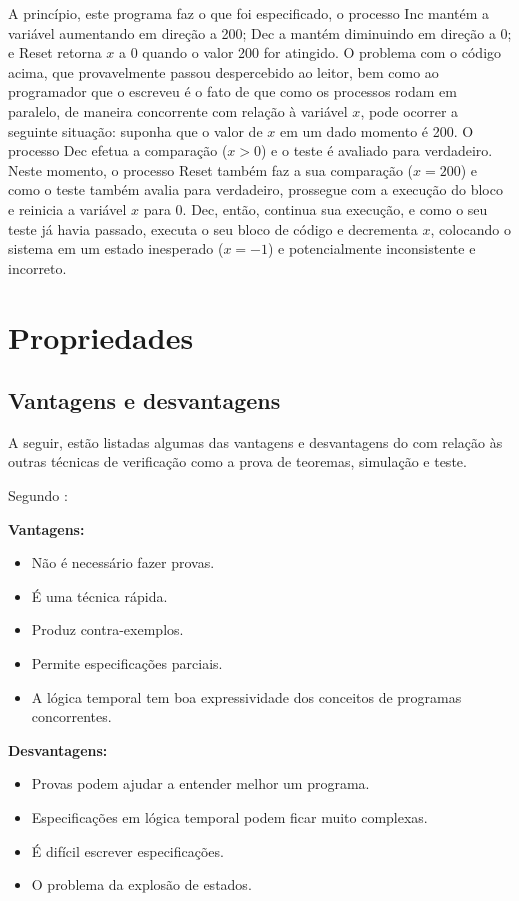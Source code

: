 \documentclass[12pt,openright,oneside,chapter=TITLE,section=TITLE,hidelinks,brazil]{utfpr-pg}
\begin{document}
A princípio, este programa faz o que foi especificado, o processo \textsf{Inc} mantém a variável aumentando em direção a 200; \textsf{Dec} a mantém diminuindo em direção a 0; e \textsf{Reset} retorna $\mathit{x}$ a 0 quando o valor 200 for atingido. O problema com o código acima, que provavelmente passou despercebido ao leitor, bem como ao programador que o escreveu é o fato de que como os processos rodam em paralelo, de maneira concorrente com relação à variável $\mathit{x}$, pode ocorrer a seguinte situação: suponha que o valor de $\mathit{x}$ em um dado momento é 200. O processo \textsf{Dec} efetua a comparação ($\mathit{x} > 0$) e o teste é avaliado para verdadeiro. Neste momento, o processo \textsf{Reset} também faz a sua comparação ($\mathit{x} = 200$) e como o teste também avalia para verdadeiro, prossegue com a execução do bloco e reinicia a variável $\mathit{x}$ para 0. \textsf{Dec}, então, continua sua execução, e como o seu teste já havia passado, executa o seu bloco de código e decrementa $\mathit{x}$, colocando o sistema em um estado inesperado ($\mathit{x} = -1$) e potencialmente inconsistente e incorreto.

\section{Propriedades}
\lipsum[55]

\subsection{Vantagens e desvantagens}
A seguir, estão listadas algumas das vantagens e desvantagens do com relação às outras técnicas de verificação como a prova de teoremas, simulação e teste.

Segundo :

\noindent
\begin{minipage}[t]{0.49\columnwidth}%
\noindent \textbf{Vantagens:}
\begin{itemize}
\item Não é necessário fazer provas.
\item É uma técnica rápida.
\item Produz contra-exemplos.
\item Permite especificações parciais.
\item A lógica temporal tem boa expressividade dos conceitos de programas concorrentes.
\end{itemize}
\end{minipage}%
\begin{minipage}[t]{0.49\columnwidth}%
\textbf{Desvantagens:}
\begin{itemize}
\item Provas podem ajudar a entender melhor um programa.
\item Especificações em lógica temporal podem ficar muito complexas.
\item É difícil escrever especificações.
\item O problema da explosão de estados.
\end{itemize}
\end{minipage}
\end{document}
